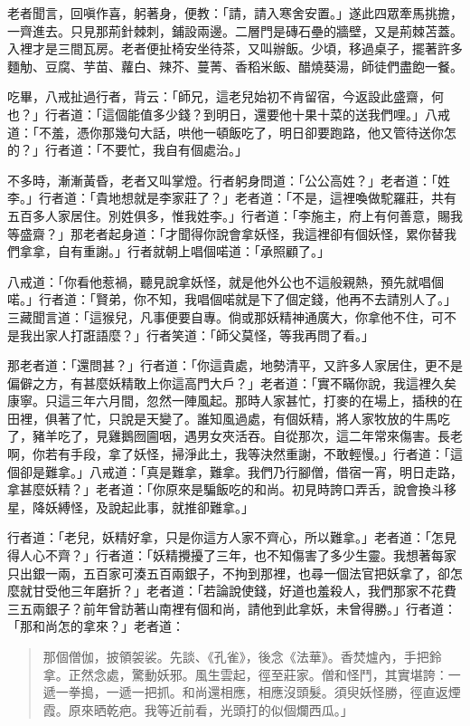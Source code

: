 老者聞言，回嗔作喜，躬著身，便教：「請，請入寒舍安置。」遂此四眾牽馬挑擔，一齊進去。只見那荊針棘刺，鋪設兩邊。二層門是磚石壘的牆壁，又是荊棘苫蓋。入裡才是三間瓦房。老者便扯椅安坐待茶，又叫辦飯。少頃，移過桌子，擺著許多麵觔、豆腐、芋苗、蘿白、辣芥、蔓菁、香稻米飯、醋燒葵湯，師徒們盡飽一餐。

吃畢，八戒扯過行者，背云：「師兄，這老兒始初不肯留宿，今返設此盛齋，何也？」行者道：「這個能值多少錢？到明日，還要他十果十菜的送我們哩。」八戒道：「不羞，憑你那幾句大話，哄他一頓飯吃了，明日卻要跑路，他又管待送你怎的？」行者道：「不要忙，我自有個處治。」

不多時，漸漸黃昏，老者又叫掌燈。行者躬身問道：「公公高姓？」老者道：「姓李。」行者道：「貴地想就是李家莊了？」老者道：「不是，這裡喚做駝羅莊，共有五百多人家居住。別姓俱多，惟我姓李。」行者道：「李施主，府上有何善意，賜我等盛齋？」那老者起身道：「才聞得你說會拿妖怪，我這裡卻有個妖怪，累你替我們拿拿，自有重謝。」行者就朝上唱個喏道：「承照顧了。」

八戒道：「你看他惹禍，聽見說拿妖怪，就是他外公也不這般親熱，預先就唱個喏。」行者道：「賢弟，你不知，我唱個喏就是下了個定錢，他再不去請別人了。」三藏聞言道：「這猴兒，凡事便要自專。倘或那妖精神通廣大，你拿他不住，可不是我出家人打誑語麼？」行者笑道：「師父莫怪，等我再問了看。」

那老者道：「還問甚？」行者道：「你這貴處，地勢清平，又許多人家居住，更不是偏僻之方，有甚麼妖精敢上你這高門大戶？」老者道：「實不瞞你說，我這裡久矣康寧。只這三年六月間，忽然一陣風起。那時人家甚忙，打麥的在場上，插秧的在田裡，俱著了忙，只說是天變了。誰知風過處，有個妖精，將人家牧放的牛馬吃了，豬羊吃了，見雞鵝囫圇咽，遇男女夾活吞。自從那次，這二年常來傷害。長老啊，你若有手段，拿了妖怪，掃淨此土，我等決然重謝，不敢輕慢。」行者道：「這個卻是難拿。」八戒道：「真是難拿，難拿。我們乃行腳僧，借宿一宵，明日走路，拿甚麼妖精？」老者道：「你原來是騙飯吃的和尚。初見時誇口弄舌，說會換斗移星，降妖縛怪，及說起此事，就推卻難拿。」

行者道：「老兒，妖精好拿，只是你這方人家不齊心，所以難拿。」老者道：「怎見得人心不齊？」行者道：「妖精攪擾了三年，也不知傷害了多少生靈。我想著每家只出銀一兩，五百家可湊五百兩銀子，不拘到那裡，也尋一個法官把妖拿了，卻怎麼就甘受他三年磨折？」老者道：「若論說使錢，好道也羞殺人，我們那家不花費三五兩銀子？前年曾訪著山南裡有個和尚，請他到此拿妖，未曾得勝。」行者道：「那和尚怎的拿來？」老者道：
\begin{quote}
那個僧伽，披領袈裟。先談、《孔雀》，後念《法華》。香焚爐內，手把鈴拿。正然念處，驚動妖邪。風生雲起，徑至莊家。僧和怪鬥，其實堪誇：一遞一拳搗，一遞一把抓。和尚還相應，相應沒頭髮。須臾妖怪勝，徑直返煙霞。原來晒乾疤。我等近前看，光頭打的似個爛西瓜。」
\end{quote}

